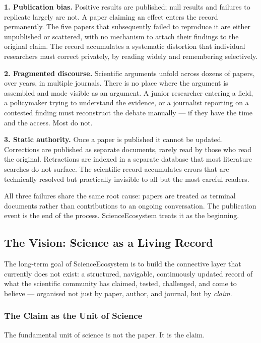 \textbf{1. Publication bias.}
Positive results are published; null results and failures to replicate largely
are not. A paper claiming an effect enters the record permanently. The five
papers that subsequently failed to reproduce it are either unpublished or
scattered, with no mechanism to attach their findings to the original claim.
The record accumulates a systematic distortion that individual researchers must
correct privately, by reading widely and remembering selectively.

\textbf{2. Fragmented discourse.}
Scientific arguments unfold across dozens of papers, over years, in multiple
journals. There is no place where the argument is assembled and made visible as
an argument. A junior researcher entering a field, a policymaker trying to
understand the evidence, or a journalist reporting on a contested finding must
reconstruct the debate manually — if they have the time and the access. Most
do not.

\textbf{3. Static authority.}
Once a paper is published it cannot be updated. Corrections are published as
separate documents, rarely read by those who read the original. Retractions are
indexed in a separate database that most literature searches do not surface.
The scientific record accumulates errors that are technically resolved but
practically invisible to all but the most careful readers.

All three failures share the same root cause: papers are treated as terminal
documents rather than contributions to an ongoing conversation. The publication
event is the end of the process. ScienceEcosystem treats it as the beginning.

\subsection*{The Vision: Science as a Living Record}

The long-term goal of ScienceEcosystem is to build the connective layer that
currently does not exist: a structured, navigable, continuously updated record
of what the scientific community has claimed, tested, challenged, and come to
believe — organised not just by paper, author, and journal, but by
\emph{claim}.

\subsubsection*{The Claim as the Unit of Science}

The fundamental unit of science is not the paper. It is the claim.

